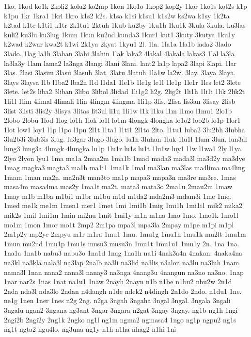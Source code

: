 {1ko.
1kod
ko1k
2koli2
kolu2
ko2mp
1kon
1ko1o
1kop2
kop2y
1kor
1ko1s
kot2s
k1p
k1pu
1kr
1kra1
1kri
1kro
k1s2
k2s.
k1sa
k1si
k1su1
k1s2w
ks2wa
k1sy
1k2ta
k2tad
k1te
k1ti1
k1tr
2k1tu1
2ktuh
1kub
ku2by
1ku1h
1ku1k
3kula
3kula.
ku3las
kuli2
ku3lu
ku3lug
1kum
1kun
ku2nd
kunda3
1kur1
kut1
3kuty
3kutya
1ku1y
k2wad
k2war
kwa2t
k1wi
2k1ya
2kyat
1kyu1
2l.
1la.
1la1a
1la1b
lada2
3lado
3lado.
1lag
la1h
3lahan
3lahi
3lahin
1lak
laka2
4lakal
4lakala
lakas3
1lal
la3la
la3la3y
1lam
lama2
la3nga
3langi
3lani
3lani.
lant2
la1p
lapa2
3lapi
3lapi.
1lar
3las.
2lasi
3lasim
3lasu
3lasub
3lat.
3latu
3latuh
1la1w
la2w.
3lay.
3laya
3laya.
3lays
3laysa
l1b
l1ba2
lba2n
l1d
l1da1
1le1b
1le1g
le1l
1le1p
1le1r
1les
let2
3lete
3lete.
let2s
liba2
3liban
3libo
3libol
3lidad
1li1g2
li2g.
2lig2t
1li1h
1li1i
1lik
2lik2t
1li1l
1lim
4limal
4limali
1lin
4lingm
4lingma
1li1p
3lis.
2lisa
lis3an
3lisay
2lisb
3list
3listi
3lis2y
3lisya
3litas
lit3ul
li1u
1li1w
l1k
l1ku
l1m
l1mo
l1mu1
2lo1b
2lobo
2lobu
1lod
1log
lo1h
1lok
lo1l
lo1m
4longk
4longka
lo1o2
loo2b
lo1p
1lor1
1lot
low1
loy1
l1p
l1po
l1pu
2l1t
l1ta1
l1ti1
2l1to
2lto.
l1tu1
luba2
3lu2bh
3lubha
3lu2b3i
3lub3is
3lug.
lu3gar
3lugo
3lugo.
lu1h
3luhan
1luk
1lu1l
1lum
3lun.
lun3al
lung3
lung3a
4lungk
4lungka
lu1p
1lu1r
lu1s
lu1t
1lu1w
luy1
l1w
l1wa1
2ly
l1ya
2lyo
2lyon
lyu1
1ma
ma1a
2maa2m
1ma1b
1mad
mada3
mada3l
ma3d2y
ma3dye
1mag
magka3
magta3
ma1h
ma1i1
1ma1k
1mal
ma3lan
ma3las
ma4lima
ma4ling
1mam
1man
ma2n.
ma2n3t
man3to
ma1p
mapa3
mapa3n
ma3re
ma3re.
1mas
masa4m
masa4ma
mas2y
1ma1t
ma2t.
mata3
mata3o
2ma1u
2mau2m
1maw
1may
m1b
m1ba
m1bi1
m1br
m1bu
m1d
m1da2
mda2m3
mdam3i
1me
1me.
1med
me1k
me1m
1men1
mer1
1met
1mi
1mi1b
1mig
1mi1h
1mi1i1
mik2
mika2
mik2s
1mil
1mi1m
1min
mi2nu
1mit
1mi1y
m1n
m1na
1mo
1mo.
1mo1k
1mo1l
mo1m
1mon
1mor
mo1t
2mp2
2m1pa
mpa3l
mpa3la
2mpay
m1pe
m1pi
m1pl
2m1p2y
mp2ye
2mpyu
m1r
m1ra
1mu1
1mu.
1mu1g
1mu1h
1mu1k
mu2lt
1mu1m
1mun
mu2nd
1mu1p
1mu1s
musu3
musu3n
1mu1t
1mu1u1
1mu1y
2n.
1na
1na.
1na1a
1na1b
nabu3
nabu3o
1na1d
1nag
1na1h
na1i
4nak3a4n
4nakan.
4naka4na
na3kl
na3kla
nala3l
na3lap
2nalb
na3li
na3lid
na3lis
n3alon
na3lu
na3luh
1nam
nama3l
1nan
nana2
nana3l
nanay3
na3nga
4nang3u
4nangun
na3no
na3no.
1nap
1nar
nar2s
1nas
1nat
na1u1
1naw
2nayh
2nayn
n1b
n1be
n1bu2
nbu2w
2n1d
2nda
nda3l
nda3lo
2ndan
n4dangh
n1de
ndek2
n4dingh
2n1do
2ndo.
n1du1
1ne.
ne1g
1nen
1ner
1nes
n2g
2ng.
n2ga
3ngah
3ngaha
3ngal
3ngal.
3ngala
3ngali
3ngalu
ngan2
3ngana
ng3ant
3ngar
3ngara
n2gat
3ngay
3ngay.
ng1b
ng1h
1ngi
2ngi2b
2ngi2y
2ng1k
2ngko
ng1l
ng1m
ngma2
ngmasa4
1ngo
ng1p
ngpu2
ng1s
ng1t
ngta2
ngu4lo.
ng3una
ng1y
n1h
n1ha
nhag2
n1hi
1ni
}
